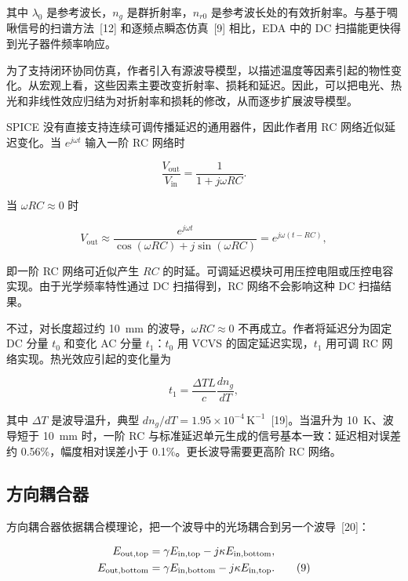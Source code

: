 \documentclass[11pt,a4paper]{ctexart}
\begin{document}
其中 $\lambda_0$ 是参考波长，$n_g$ 是群折射率，$n_{r0}$ 是参考波长处的有效折射率。与基于啁啾信号的扫谱方法~[12] 和逐频点瞬态仿真~[9] 相比，EDA 中的 DC 扫描能更快得到光子器件频率响应。

为了支持闭环协同仿真，作者引入有源波导模型，以描述温度等因素引起的物性变化。从宏观上看，这些因素主要改变折射率、损耗和延迟。因此，可以把电光、热光和非线性效应归结为对折射率和损耗的修改，从而逐步扩展波导模型。

SPICE 没有直接支持连续可调传播延迟的通用器件，因此作者用 RC 网络近似延迟变化。当 $e^{j\omega t}$ 输入一阶 RC 网络时

\begin{equation}
\frac{V_{\mathrm{out}}}{V_{\mathrm{in}}}=\frac{1}{1+j\omega RC}.
\tag{6}
\end{equation}

当 $\omega RC\approx0$ 时

\begin{equation}
V_{\mathrm{out}}\approx
\frac{e^{j\omega t}}{\cos(\omega RC)+j\sin(\omega RC)}
=e^{j\omega(t-RC)},
\tag{7}
\end{equation}

即一阶 RC 网络可近似产生 $RC$ 的时延。可调延迟模块可用压控电阻或压控电容实现。由于光学频率特性通过 DC 扫描得到，RC 网络不会影响这种 DC 扫描结果。

不过，对长度超过约 10~mm 的波导，$\omega RC\approx0$ 不再成立。作者将延迟分为固定 DC 分量 $t_0$ 和变化 AC 分量 $t_1$：$t_0$ 用 VCVS 的固定延迟实现，$t_1$ 用可调 RC 网络实现。热光效应引起的变化量为

\begin{equation}
t_1=\frac{\Delta TL}{c}\frac{dn_g}{dT},
\tag{8}
\end{equation}

其中 $\Delta T$ 是波导温升，典型 $dn_g/dT=1.95\times10^{-4}\,\mathrm{K}^{-1}$~[19]。当温升为 10~K、波导短于 10~mm 时，一阶 RC 与标准延迟单元生成的信号基本一致：延迟相对误差约 0.56\%，幅度相对误差小于 0.1\%。更长波导需要更高阶 RC 网络。

\subsection{方向耦合器}

方向耦合器依据耦合模理论，把一个波导中的光场耦合到另一个波导~[20]：

\begin{align}
E_{\mathrm{out,top}}&=\gamma E_{\mathrm{in,top}}-j\kappa E_{\mathrm{in,bottom}},\notag\\
E_{\mathrm{out,bottom}}&=\gamma E_{\mathrm{in,bottom}}-j\kappa E_{\mathrm{in,top}}.
\tag{9}
\end{align}
\end{document}
